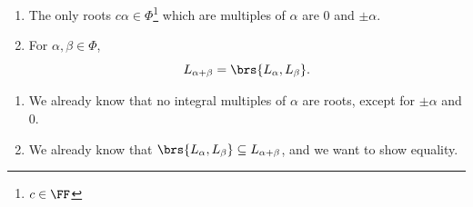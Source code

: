\documentclass[10pt,a4paper,twoside,openany,hidelinks]{book}
\begin{document}
\begin{theorem}
\begin{enumerate}
\item The only roots $c \alpha \in \Phi$\footnote{$c \in \FF$} which are multiples of $\alpha$ are $0$ and $\pm \alpha$. 
\item For $\alpha,\beta \in \Phi$, \[L_{\alpha + \beta} = \brs{L_{\alpha},L_{\beta}} \text{.} \]
\end{enumerate}
\end{theorem}
\begin{remark}
\begin{enumerate}
\item We already know that no integral multiples of $\alpha$ are roots, except for $\pm \alpha$ and $0$.
\item We already know that $\brs{L_{\alpha}, L_{\beta}} \subseteq L_{\alpha + \beta}$, and we want to show equality.
\end{enumerate}
\end{remark}
\end{document}
